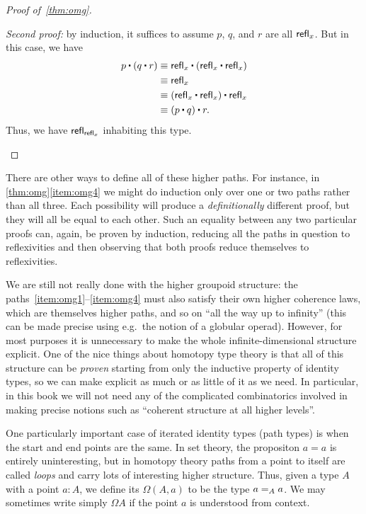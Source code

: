 \begin{proof}[Proof of~\autoref{thm:omg}]
\begin{enumerate}
    \mentalpause

    \noindent \emph{Second proof:} by induction, it suffices to assume $p$, $q$, and $r$ are all $\refl x$.
    But in this case, we have
    \begin{align*}
      p\ct (q\ct r)
      &\jdeq \refl{x}\ct(\refl{x}\ct \refl{x})\\
      &\jdeq \refl{x}\\
      &\jdeq (\refl{x}\ct \refl x)\ct \refl x\\
      &\jdeq (p\ct q)\ct r.
    \end{align*}
    Thus, we have $\refl{\refl{x}}$ inhabiting this type. \qedhere
  \end{enumerate}
\end{proof}

\begin{rmk}
  There are other ways to define all of these higher paths.
  For instance, in \autoref{thm:omg}\ref{item:omg4} we might do induction only over one or two paths rather than all three.
  Each possibility will produce a \emph{definitionally} different proof, but they will all be equal to each other.
  Such an equality between any two particular proofs can, again, be proven by induction, reducing all the paths in question to reflexivities and then observing that both proofs reduce themselves to reflexivities.
\end{rmk}

We are still not really done with the higher groupoid structure: the paths~\ref{item:omg1}--\ref{item:omg4} must also satisfy their own higher coherence laws, which are themselves higher paths,
%
and so on ``all the way up to infinity'' (this can be made precise using e.g.\ the notion of a globular operad).
However, for most purposes it is unnecessary to make the whole infinite-dimensional structure explicit.
One of the nice things about homotopy type theory is that all of this structure can be \emph{proven} starting from only the inductive property of identity types, so we can make explicit as much or as little of it as we need.
In particular, in this book we will not need any of the complicated combinatorics involved in making precise notions such as ``coherent structure at all higher levels''.

One particularly important case of iterated identity types (path types) is when the start and end points are the same.
In set theory, the propositon $a=a$ is entirely uninteresting, but in homotopy theory paths from a point to itself are called \emph{loops} and carry lots of interesting higher structure.
Thus, given a type $A$ with a point $a:A$, we define its 
%
$\Omega(A,a)$ to be the type $\id[A]{a}{a}$.
We may sometimes write simply $\Omega A$ if the point $a$ is understood from context.

